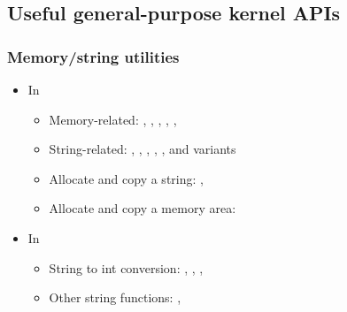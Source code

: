 \subsection{Useful general-purpose kernel APIs}

\begin{frame}
  \frametitle{Memory/string utilities}
  \begin{itemize}
  \item In 
    \begin{itemize}
    \item Memory-related: , ,
      , , , 
    \item String-related: , , ,
      , ,  and variants
    \item Allocate and copy a string: , 
    \item Allocate and copy a memory area: 
    \end{itemize}
  \item In 
    \begin{itemize}
    \item String to int conversion: ,
      , ,
    \item Other string functions: , 
    \end{itemize}
  \end{itemize}
\end{frame}

